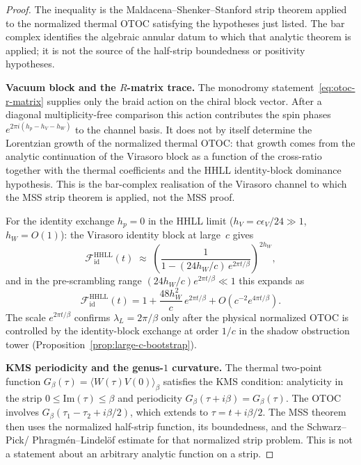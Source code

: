\begin{proof}
The inequality is the Maldacena--Shenker--Stanford strip theorem
applied to the normalized thermal OTOC satisfying the hypotheses just
listed.  The bar complex identifies the algebraic annular datum to
which that analytic theorem is applied; it is not the source of the
half-strip boundedness or positivity hypotheses.

\medskip
\noindent\textbf{Vacuum block and the \(R\)-matrix trace.}
The monodromy statement~\eqref{eq:otoc-r-matrix} supplies only the
braid action on the chiral block vector.  After a diagonal
multiplicity-free comparison this action contributes the spin phases
\(e^{2\pi i(h_p-h_V-h_W)}\) to the channel basis.  It does not by
itself determine the Lorentzian growth of the normalized thermal OTOC:
that growth comes from the analytic continuation of the Virasoro block
as a function of the cross-ratio together with the thermal coefficients
and the HHLL identity-block dominance hypothesis.  This is the
bar-complex realisation of the Virasoro channel to which the MSS strip
theorem is applied, not the MSS proof.

For the identity exchange $h_p = 0$ in the HHLL limit
($h_V = c\epsilon_V/24 \gg 1$, $h_W = O(1)$): the Virasoro
identity block at large~$c$ gives~\cite{Shenker-Stanford14}
\begin{equation}\label{eq:virasoro-identity-block-otoc}
\mathcal{F}_{\mathrm{id}}^{\mathrm{HHLL}}(t)
\;\approx\;
\left(
 \frac{1}{1 - (24h_W/c)\,e^{2\pi t/\beta}}
\right)^{2h_W},
\end{equation}
and in the pre-scrambling range
\((24h_W/c)e^{2\pi t/\beta}\ll1\) this expands as
\[
\mathcal{F}_{\mathrm{id}}^{\mathrm{HHLL}}(t)
=1+\frac{48h_W^2}{c}\,e^{2\pi t/\beta}
  +O\!\left(c^{-2}e^{4\pi t/\beta}\right).
\]
The scale \(e^{2\pi t/\beta}\) confirms
\(\lambda_L=2\pi/\beta\) only after the physical normalized OTOC is
controlled by the identity-block exchange at order \(1/c\) in the
shadow obstruction tower
(Proposition~\ref{prop:large-c-bootstrap}).

\medskip
\noindent\textbf{KMS periodicity and the genus-$1$
 curvature.}
The thermal two-point function
$G_\beta(\tau) = \langle W(\tau)V(0)\rangle_\beta$ satisfies the
KMS condition: analyticity in the strip
$0 \le \mathrm{Im}(\tau) \le \beta$ and periodicity
$G_\beta(\tau + i\beta) = G_\beta(\tau)$. The OTOC involves
$G_\beta(\tau_1 - \tau_2 + i\beta/2)$, which extends to
$\tau = t + i\beta/2$.  The MSS theorem then uses the normalized
half-strip function, its boundedness, and the Schwarz--Pick/
Phragm\'{e}n--Lindel\"{o}f estimate for that normalized strip
problem.  This is not a statement about an arbitrary analytic
function on a strip.


\end{proof}
